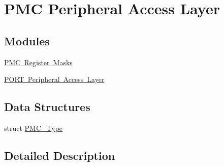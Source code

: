 \hypertarget{group___p_m_c___peripheral___access___layer}{}\section{P\+MC Peripheral Access Layer}
\label{group___p_m_c___peripheral___access___layer}
\subsection*{Modules}
\begin{DoxyCompactItemize}
\item 
\mbox{\hyperlink{group___p_m_c___register___masks}{P\+M\+C Register Masks}}
\item 
\mbox{\hyperlink{group___p_o_r_t___peripheral___access___layer}{P\+O\+R\+T Peripheral Access Layer}}
\end{DoxyCompactItemize}
\subsection*{Data Structures}
\begin{DoxyCompactItemize}
\item 
struct \mbox{\hyperlink{struct_p_m_c___type}{P\+M\+C\+\_\+\+Type}}
\end{DoxyCompactItemize}


\subsection{Detailed Description}
